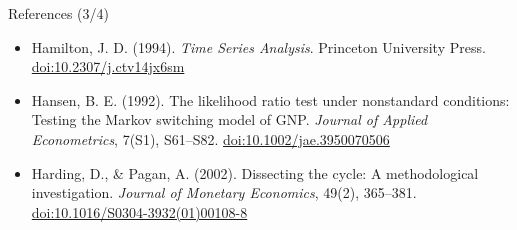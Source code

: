 \begin{frame}{References (3/4)}
\begin{itemize}
    \item Hamilton, J. D. (1994). \textit{Time Series Analysis}. Princeton University Press. \href{https://doi.org/10.2307/j.ctv14jx6sm}{doi:10.2307/j.ctv14jx6sm}
    \item Hansen, B. E. (1992). The likelihood ratio test under nonstandard conditions: Testing the Markov switching model of GNP. \textit{Journal of Applied Econometrics}, 7(S1), S61--S82. \href{https://doi.org/10.1002/jae.3950070506}{doi:10.1002/jae.3950070506}
    \item Harding, D., \& Pagan, A. (2002). Dissecting the cycle: A methodological investigation. \textit{Journal of Monetary Economics}, 49(2), 365--381. \href{https://doi.org/10.1016/S0304-3932(01)00108-8}{doi:10.1016/S0304-3932(01)00108-8}
\end{itemize}
\end{frame}

